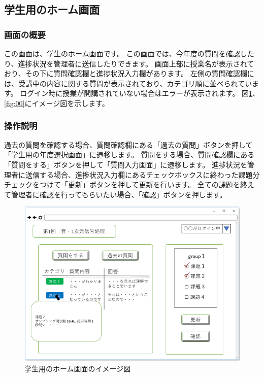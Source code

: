 \subsection{学生用のホーム画面}
\subsubsection{画面の概要}
この画面は、学生のホーム画面です。
この画面では、今年度の質問を確認したり、進捗状況を管理者に送信したりできます。
画面上部に授業名が表示されており、その下に質問確認欄と進捗状況入力欄があります。
左側の質問確認欄には、受講中の内容に関する質問が表示されており、カテゴリ順に並べられています。
ログイン時に授業が開講されていない場合はエラーが表示されます。
図\ref{fig:28}、\ref{fig:00}にイメージ図を示します。

\subsubsection{操作説明}
過去の質問を確認する場合、質問確認欄にある「過去の質問」ボタンを押して「学生用の年度選択画面」に遷移します。
質問をする場合、質問確認欄にある「質問をする」ボタンを押して「質問入力画面」に遷移します。
進捗状況を管理者に送信する場合、進捗状況入力欄にあるチェックボックスに終わった課題分チェックをつけて「更新」ボタンを押して更新を行います。
全ての課題を終えて管理者に確認を行ってもらいたい場合、「確認」ボタンを押します。

\begin{figure}[phtbp]
  \begin{center}
    \includegraphics[width=0.8\linewidth,clip]{./img/28.png}
    \caption{学生用のホーム画面のイメージ図}\label{fig:28}
  \end{center}
\end{figure}


